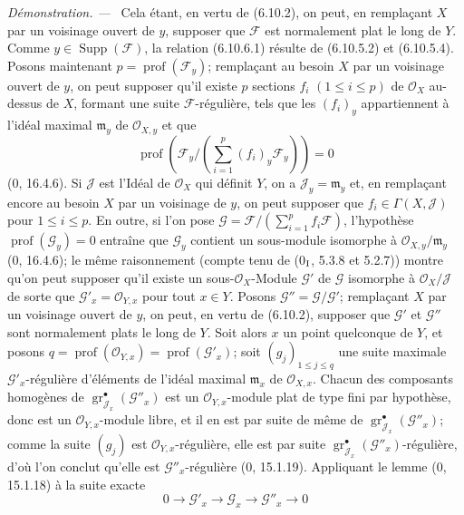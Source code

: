 \documentclass[10pt,oneside]{book}
\newenvironment{proof}{%
  \par\medskip\noindent\textit{Démonstration. ---\ }}{\par}
\begin{document}
\begin{proof}
Cela étant, en vertu de (6.10.2), on peut, en remplaçant $X$ par un
voisinage ouvert de $y$, supposer que $\mathcal F$ est normalement plat le
long de $Y$. Comme $y\in\operatorname{Supp}(\mathcal F)$, la relation
(6.10.6.1) résulte de (6.10.5.2) et (6.10.5.4). Posons maintenant
$p=\operatorname{prof}(\mathcal F_y)$; remplaçant au besoin $X$ par un
voisinage ouvert de $y$, on peut supposer qu'il existe $p$ sections $f_i$
$(1\leq i\leq p)$ de $\mathcal O_X$ au-dessus de $X$, formant une suite
$\mathcal F$-régulière, tels que les $(f_i)_y$ appartiennent à l'idéal
maximal $\mathfrak m_y$ de $\mathcal O_{X,y}$ et que
\[
\operatorname{prof}\left(\mathcal F_y/
\left(\sum_{i=1}^{p}(f_i)_y\mathcal F_y\right)\right)=0
\]
(0, 16.4.6). Si $\mathcal J$ est l'Idéal de $\mathcal O_X$ qui définit
$Y$, on a $\mathcal J_y=\mathfrak m_y$ et, en remplaçant encore au besoin $X$
par un voisinage de $y$, on peut supposer que
$f_i\in\Gamma(X,\mathcal J)$ pour $1\leq i\leq p$. En outre, si l'on pose
$\mathcal G=\mathcal F/(\sum_{i=1}^{p}f_i\mathcal F)$, l'hypothèse
$\operatorname{prof}(\mathcal G_y)=0$ entraîne que $\mathcal G_y$ contient
un sous-module isomorphe à
$\mathcal O_{X,y}/\mathfrak m_y$ (0, 16.4.6); le même raisonnement (compte
tenu de (0$_{\rm I}$, 5.3.8 et 5.2.7)) montre qu'on peut supposer qu'il
existe un sous-$\mathcal O_X$-Module $\mathcal G'$ de $\mathcal G$
isomorphe à $\mathcal O_X/\mathcal J$ de sorte que
$\mathcal G'_x=\mathcal O_{Y,x}$ pour tout $x\in Y$. Posons
$\mathcal G''=\mathcal G/\mathcal G'$; remplaçant $X$ par un voisinage
ouvert de $y$, on peut, en vertu de (6.10.2), supposer que $\mathcal G'$ et
$\mathcal G''$ sont normalement plats le long de $Y$. Soit alors $x$ un
point quelconque de $Y$, et posons
$q=\operatorname{prof}(\mathcal O_{Y,x})=\operatorname{prof}(\mathcal G'_x)$;
soit $(g_j)_{1\leq j\leq q}$ une suite maximale
$\mathcal G'_x$-régulière d'éléments de l'idéal maximal
$\mathfrak m_x$ de $\mathcal O_{X,x}$. Chacun des composants homogènes de
$\operatorname{gr}_{\mathcal J_x}^{\bullet}(\mathcal G''_x)$ est un
$\mathcal O_{Y,x}$-module plat de type fini par hypothèse, donc est un
$\mathcal O_{Y,x}$-module libre, et il en est par suite de même de
$\operatorname{gr}_{\mathcal J_x}^{\bullet}(\mathcal G''_x)$; comme la
suite $(g_j)$ est $\mathcal O_{Y,x}$-régulière, elle est par suite
$\operatorname{gr}_{\mathcal J_x}^{\bullet}(\mathcal G''_x)$-régulière,
d'où l'on conclut qu'elle est $\mathcal G''_x$-régulière (0, 15.1.19).
Appliquant le lemme (0, 15.1.18) à la suite exacte
\[
0\longrightarrow\mathcal G'_x\longrightarrow\mathcal G_x
\longrightarrow\mathcal G''_x\longrightarrow0
\]
\end{proof}
\end{document}
